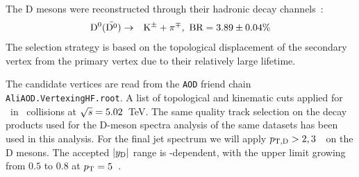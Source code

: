 The D mesons were reconstructed through their hadronic decay channels~\cite{Tanabashi:2018oca}:
\begin{eqnarray*}
\mathrm{D^{0}} (\bar{\mathrm{D^{0}}}) &\to& {\rm K}^{\pm} + \pi^{\mp}  , {\text{ BR}} = 3.89\pm {0.04} \%\\
\end{eqnarray*}
The selection strategy is based on the topological displacement of the secondary vertex from the primary vertex due to their relatively large lifetime.

The candidate vertices are read from the \texttt{AOD} friend chain \texttt{AliAOD.VertexingHF.root}. A list of topological and kinematic cuts applied for \Dzero\ in \pp\ collisions at $\sqrt{s}=5.02$~TeV.
The same quality track selection on the decay products used for the D-meson spectra analysis of the same datasets has been used in this analysis.
For the final jet spectrum we will apply $p_{\mathrm{T,D}}> 2, 3$~\GeVc\ on the D mesons. The accepted $|y_{\rm D}|$ range is \pt-dependent, with the upper limit growing from $0.5$ to $0.8$ at $p_{\rm T}=5$~\GeVc.

